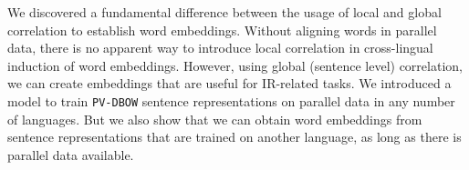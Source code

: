 
We discovered a fundamental difference between the usage of local and global correlation to establish word embeddings. Without aligning words in parallel data, there is no apparent way to introduce local correlation in cross-lingual induction of word embeddings. However, using global (sentence level) correlation, we can create embeddings that are useful for IR-related tasks. We introduced a model to train {\tt PV-DBOW} sentence representations on parallel data in any number of languages. But we also show that we can obtain word embeddings from sentence representations that are trained on another language, as long as there is parallel data available.